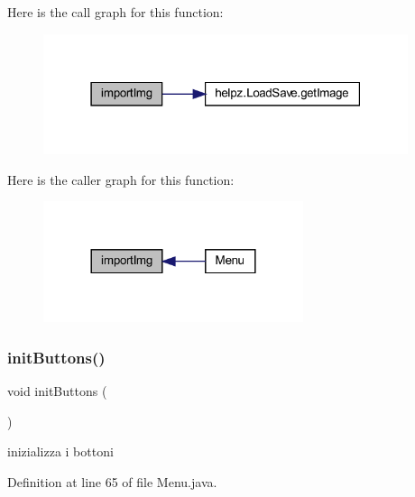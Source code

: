 Here is the call graph for this function\+:\nopagebreak
\begin{figure}[H]
\begin{center}
\leavevmode
\includegraphics[width=303pt]{classscenes_1_1_menu_ababe61393d9a835b23b1fd6675da3914_cgraph}
\end{center}
\end{figure}
Here is the caller graph for this function\+:\nopagebreak
\begin{figure}[H]
\begin{center}
\leavevmode
\includegraphics[width=216pt]{classscenes_1_1_menu_ababe61393d9a835b23b1fd6675da3914_icgraph}
\end{center}
\end{figure}
\mbox{\label{classscenes_1_1_menu_a27d3ba5afb772cc36c9a432c28975ace}} 
\subsubsection{\texorpdfstring{init\+Buttons()}{initButtons()}}
{\footnotesize\ttfamily void init\+Buttons (\begin{DoxyParamCaption}{ }\end{DoxyParamCaption})\hspace{0.3cm}{\ttfamily [private]}}



inizializza i bottoni 



Definition at line 65 of file Menu.\+java.

